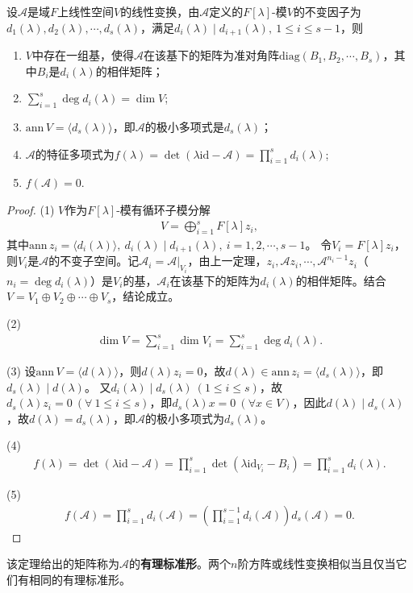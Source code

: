 \documentclass[../../main.tex]{subfiles}%
\begin{document}
\begin{theorem}
设$\mathscr{A}$是域$F$上线性空间$V$的线性变换，由$\mathscr{A}$定义的$F[\lambda]$-模$V$的不变因子为$d_1(\lambda),d_2(\lambda),\cdots,d_s(\lambda)$，满足$d_i(\lambda)\mid d_{i+1}(\lambda),\ 1\leqslant i\leqslant s-1$，则
\begin{enumerate}[(1)]
\item $V$中存在一组基，使得$\mathscr{A}$在该基下的矩阵为准对角阵$\mathrm{diag}(B_1,B_2,\cdots,B_s)$，其中$B_i$是$d_i(\lambda)$的相伴矩阵；
\item $\displaystyle\sum_{i=1}^s\deg d_i(\lambda)=\dim V$;
\item $\mathrm{ann}\,V=\langle d_s(\lambda)\rangle$，即$\mathscr{A}$的极小多项式是$d_s(\lambda)$；
\item $\mathscr{A}$的特征多项式为$f(\lambda)=\det(\lambda\mathrm{id}-\mathscr{A})=\displaystyle\prod_{i=1}^s d_i(\lambda)$;
\item $f(\mathscr{A})=0$.
\end{enumerate}
\end{theorem}
\begin{proof}
(1) $V$作为$F[\lambda]$-模有循环子模分解
\begin{align*}
V=\bigoplus_{i=1}^s F[\lambda]z_i,
\end{align*}
其中$\mathrm{ann}\,z_i=\langle d_i(\lambda)\rangle,\ d_i(\lambda)\mid d_{i+1}(\lambda),\ i=1,2,\cdots,s-1$。
令$V_i=F[\lambda]z_i$，则$V_i$是$\mathscr{A}$的不变子空间。记$\mathscr{A}_i=\mathscr{A}|_{V_i}$，由上一定理，$z_i,\mathscr{A}z_i,\cdots,\mathscr{A}^{n_i-1}z_i$（$n_i=\deg d_i(\lambda)$）是$V_i$的基，$\mathscr{A}_i$在该基下的矩阵为$d_i(\lambda)$的相伴矩阵。结合$V=V_1\oplus V_2\oplus\cdots\oplus V_s$，结论成立。

(2) 
\begin{align*}
\dim V=\sum_{i=1}^s\dim V_i=\sum_{i=1}^s\deg d_i(\lambda).
\end{align*}

(3) 设$\mathrm{ann}\,V=\langle d(\lambda)\rangle$，则$d(\lambda)z_i=0$，故$d(\lambda)\in\mathrm{ann}\,z_i=\langle d_s(\lambda)\rangle$，即$d_s(\lambda)\mid d(\lambda)$。
又$d_i(\lambda)\mid d_s(\lambda)\ (1\leqslant i\leqslant s)$，故$d_s(\lambda)z_i=0\ (\forall\ 1\leqslant i\leqslant s)$，即$d_s(\lambda)x=0\ (\forall x\in V)$，因此$d(\lambda)\mid d_s(\lambda)$，故$d(\lambda)=d_s(\lambda)$，即$\mathscr{A}$的极小多项式为$d_s(\lambda)$。

(4)
\begin{align*}
f(\lambda)=\det(\lambda\mathrm{id}-\mathscr{A})=\prod_{i=1}^s\det(\lambda\mathrm{id}_{V_i}-B_i)=\prod_{i=1}^s d_i(\lambda).
\end{align*}

(5)
\begin{align*}
f(\mathscr{A})=\prod_{i=1}^s d_i(\mathscr{A})=\left(\prod_{i=1}^{s-1}d_i(\mathscr{A})\right)d_s(\mathscr{A})=0.
\end{align*}
\end{proof}
\begin{remark}
该定理给出的矩阵称为$\mathscr{A}$的\textbf{有理标准形}。两个$n$阶方阵或线性变换相似当且仅当它们有相同的有理标准形。
\end{remark}
\end{document}
